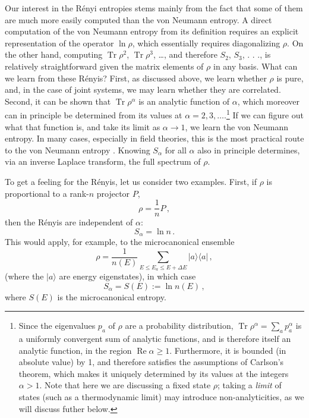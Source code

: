 \documentclass[11pt]{article}
\newcommand{\ket}[1]{|{#1}\rangle}
\newcommand{\bra}[1]{\langle{#1}|}
\DeclareMathOperator{\Tr}{Tr}
\DeclareMathOperator{\Real}{Re}
\begin{document}
Our interest in the R\'enyi entropies stems mainly from the fact that some of them are much more easily computed than the von Neumann entropy. A direct computation of the von Neumann entropy from its definition requires an explicit representation of the operator $\ln\rho$, which essentially requires diagonalizing $\rho$. On the other hand, computing $\Tr\rho^2$, $\Tr\rho^3$, \ldots, and therefore $S_2$, $S_3$, . . ., is relatively straightforward given the matrix elements of $\rho$ in any basis. What can we learn from these R\'enyis? First, as discussed above, we learn whether $\rho$ is pure, and, in the case of joint systems, we may learn whether they are correlated. Second, it can be shown that $\Tr\rho^\alpha$ is an analytic function of $\alpha$, which moreover can in principle be determined from its values at $\alpha=2,3,\ldots$.\footnote{Since the eigenvalues $p_a$ of $\rho$ are a probability distribution, $\Tr\rho^\alpha=\sum_ap_a^\alpha$ is a uniformly convergent sum of analytic functions, and is therefore itself an analytic function, in the region $\Real\alpha\ge1$. Furthermore, it is bounded (in absolute value) by 1, and therefore satisfies the assumptions of Carlson's theorem, which makes it uniquely determined by its values at the integers $\alpha>1$. Note that here we are discussing a fixed state $\rho$; taking a \emph{limit} of states (such as a thermodynamic limit) may introduce non-analyticities, as we will discuss futher below.} If we can figure out what that function is, and take its limit as $\alpha\to1$, we learn the von Neumann entropy. In many cases, especially in field theories, this is the most practical route to the von Neumann entropy \cite{Holzhey:1994we}. Knowing $S_\alpha$ for all $\alpha$ also in principle determines, via an inverse Laplace transform, the full spectrum of $\rho$.

To get a feeling for the R\'enyis, let us consider two examples. First, if $\rho$ is proportional to a rank-$n$ projector $P$,
\begin{equation}
\rho = \frac1nP\,,
\end{equation}
then the R\'enyis are independent of $\alpha$:
\begin{equation}
S_\alpha = \ln n\,.
\end{equation}
This would apply, for example, to the microcanonical ensemble
\begin{equation}
\rho = \frac1{n(E)}\sum_{E\le E_a\le E+\Delta E}\ket{a}\bra{a}\,,
\end{equation}
(where the $\ket{a}$ are energy eigenstates), in which case
\begin{equation}\label{mcrenyi}
S_\alpha = S(E) := \ln n(E)\,,
\end{equation}
where $S(E)$ is the microcanonical entropy.
\end{document}
